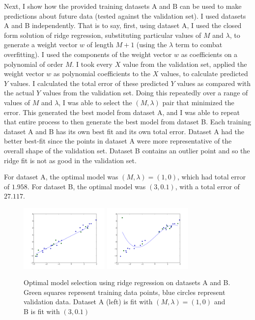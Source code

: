 \documentclass{paper}
\begin{document}
Next, I show how the provided training datasets A and B can be used to make predictions about future data (tested against the validation set). I used datasets A and B independently. That is to say, first, using dataset A, I used the closed form solution of ridge regression, substituting particular values of $M$ and $\lambda$, to generate a weight vector $w$ of length $M+1$ (using the $\lambda$ term to combat overfitting). I used the components of the weight vector $w$ as coefficients on a polynomial of order $M$. I took every $X$ value from the validation set, applied the weight vector $w$ as polynomial coefficients to the $X$ values, to calculate predicted $Y$ values. I calculated the total error of these predicted $Y$ values as compared with the actual $Y$ values from the validation set. Doing this repeatedly over a range of values of $M$ and $\lambda$, I was able to select the $(M, \lambda)$ pair that minimized the error. This generated the best model from dataset A, and I was able to repeat that entire process to then generate the best model from dataset B. Each training dataset A and B has its own best fit and its own total error. Dataset A had the better best-fit since the points in dataset A were more representative of the overall shape of the validation set. Dataset B contains an outlier point and so the ridge fit is not as good in the validation set.

For dataset A, the optimal model was $(M, \lambda) = (1, 0)$, which had total error of $1.958$. For dataset B, the optimal model was $(3, 0.1)$, with a total error of $27.117$.

\begin{figure}[H]
	\includegraphics[width=165px]{plot7-regressA-optimal.png}
	\includegraphics[width=165px]{plot8-regressB-optimal.png}
	\caption{Optimal model selection using ridge regression on datasets A and B. Green squares represent training data points, blue circles represent validation data. Dataset A (left) is fit with $(M, \lambda) = (1, 0)$ and B is fit with $(3, 0.1)$}
\end{figure}
\end{document}
